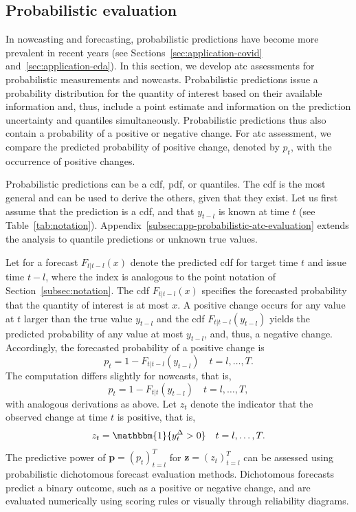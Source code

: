 \documentclass[pdflatex]{sn-jnl}
\theoremstyle{plain}%
\theoremstyle{definition}
\newcommand{\ind}[1]{\mathbbm{1}\{#1\}}
\newcommand{\diffyt}[1][t]{y^{\Delta}_{#1}}
\begin{document}
\subsection{Probabilistic evaluation}\label{subsec:aatc-probabilistic}

In nowcasting and forecasting, probabilistic predictions have become more prevalent in recent years (see Sections~\ref{sec:application-covid} and~\ref{sec:application-eda}).
In this section, we develop \ac{atc} assessments for probabilistic measurements and nowcasts.
Probabilistic predictions issue a probability distribution for the quantity of interest based on their available information and, thus, include a point estimate and information on the prediction uncertainty and quantiles simultaneously.
Probabilistic predictions thus also contain a probability of a positive or negative change.
For \ac{atc} assessment, we compare the predicted probability of positive change, denoted by $p_t$, with the occurrence of positive changes.

Probabilistic predictions can be a \ac{cdf}, \ac{pdf}, or quantiles.
The \ac{cdf} is the most general and can be used to derive the others, given that they exist.
Let us first assume that the prediction is a \ac{cdf}, and that $y_{t-l}$ is known at time $t$ (see Table~\ref{tab:notation}).
Appendix~\ref{subsec:app-probabilistic-atc-evaluation} extends the analysis to quantile predictions or unknown true values.

Let for a forecast $F_{t | t-l} (x)$ denote the predicted \ac{cdf} for target time $t$ and issue time $t - l$, where the index is analogous to the point notation of Section~\ref{subsec:notation}.
The \ac{cdf} $F_{t | t-l} (x)$ specifies the forecasted probability that the quantity of interest is at most $x$.
A positive change occurs for any value at $t$ larger than the true value $y_{t-l}$ and the \ac{cdf} $F_{t | t-l} (y_{t-l})$ yields the predicted probability of any value at most $y_{t-l}$, and, thus, a negative change.
Accordingly, the forecasted probability of a positive change is
\begin{equation*}
    p_t = 1 - F_{t | t-l} (y_{t-l})\quad t = l, \dots, T.
\end{equation*}
The computation differs slightly for nowcasts, that is,
\begin{equation*}
    p_t = 1 - F_{t | t} (y_{t-l})\quad t = l, \dots, T,
\end{equation*}
with analogous derivations as above.
Let $z_t$ denote the indicator that the observed change at time $t$ is positive, that is,
\begin{equation*}
    z_t = \ind{\diffyt > 0} \quad t = l, \dots, T.
\end{equation*}
The predictive power of $\mathbf{p} = (p_t)_{t=l}^{T}$ for $\mathbf{z} = (z_t)_{t=l}^{T}$ can be assessed using probabilistic dichotomous forecast evaluation methods.
Dichotomous forecasts predict a binary outcome, such as a positive or negative change, and are evaluated numerically using scoring rules or visually through reliability diagrams.
\end{document}

